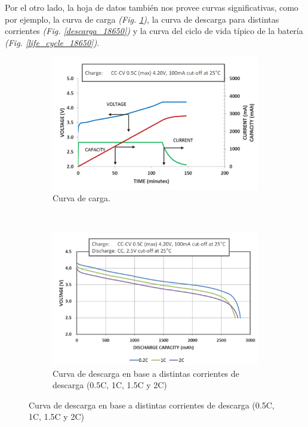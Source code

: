 \documentclass[10pt,a4paper]{article}
\begin{document}
	Por el otro lado, la hoja de datos también nos provee curvas significativas, 
    como por ejemplo, la curva de carga \emph{(Fig. \ref{cc_cv_18650})}, 
    la curva de descarga para distintas corrientes 
    \emph{(Fig. \ref{descarga_18650})} y la curva del ciclo de vida típico de 
    la batería \emph{(Fig. \ref{life_cycle_18650})}.
	
	\begin{figure}[h!]
        \begin{subfigure}[t]{.5\textwidth}
    			\includegraphics[width=1\textwidth]{cc_cv_18650.png}
    			\caption{Curva de carga.}
    			\label{cc_cv_18650}
    	\end{subfigure}%
        ~ 
    	\begin{subfigure}[t]{.5\textwidth}
    			\includegraphics[width=1\textwidth]{discharge_18650.png}
    			\caption{Curva de descarga en base a distintas corrientes de descarga (0.5C, 1C, 1.5C y 2C)}

\end{subfigure}
\end{figure}
\end{document}
